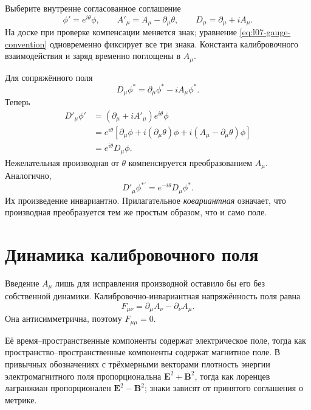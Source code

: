 Выберите внутренне согласованное соглашение
\begin{equation}
  \phi'=e^{i\theta}\phi,
  \qquad
  A'_\mu=A_\mu-\partial_\mu\theta,
  \qquad
  D_\mu=\partial_\mu+iA_\mu.
  \label{eq:l07-gauge-convention}
\end{equation}
На доске при проверке компенсации меняется знак; уравнение
\eqref{eq:l07-gauge-convention} одновременно фиксирует все три знака. Константа калибровочного
взаимодействия и заряд временно поглощены в \(A_\mu\).

Для сопряжённого поля
\begin{equation}
  D_\mu\phi^*=\partial_\mu\phi^*-iA_\mu\phi^*.
\end{equation}
Теперь
\begin{align}
  D'_\mu\phi'
  &=
  \left(\partial_\mu+iA'_\mu\right)e^{i\theta}\phi
  \nonumber\\
  &=
  e^{i\theta}
  \left[
    \partial_\mu\phi+i(\partial_\mu\theta)\phi
    +i(A_\mu-\partial_\mu\theta)\phi
  \right]
  \nonumber\\
  &=e^{i\theta}D_\mu\phi.
  \label{eq:l07-covariant-transform}
\end{align}
Нежелательная производная от \(\theta\) компенсируется преобразованием
\(A_\mu\). Аналогично,
\begin{equation}
  D'_\mu\phi^{*\prime}=e^{-i\theta}D_\mu\phi^*.
\end{equation}
Их произведение инвариантно. Прилагательное \emph{ковариантная} означает, что
производная преобразуется тем же простым образом, что и само поле.

\section{Динамика калибровочного поля}

Введение \(A_\mu\) лишь для исправления производной оставило бы его без
собственной динамики. Калибровочно-инвариантная напряжённость поля равна
\begin{equation}
  F_{\mu\nu}
  =\partial_\mu A_\nu-\partial_\nu A_\mu.
  \label{eq:l07-field-strength}
\end{equation}
Она антисимметрична, поэтому \(F_{\mu\mu}=0\).

Её время--пространственные компоненты содержат
электрическое поле, тогда как пространство--пространственные компоненты содержат магнитное
поле. В привычных обозначениях с трёхмерными векторами плотность энергии
электромагнитного поля пропорциональна \(\bm E^2+\bm B^2\), тогда как лоренцев лагранжиан
пропорционален \(\bm E^2-\bm B^2\); знаки зависят от принятого соглашения
о метрике.

